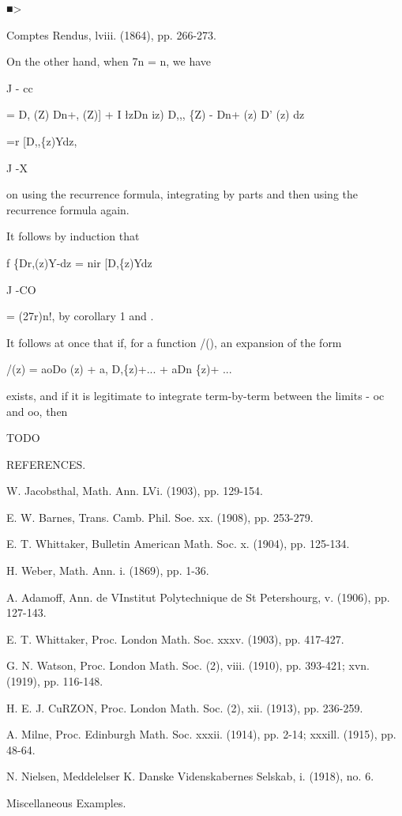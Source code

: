 ■>

Comptes Rendus, lviii. (1864), pp. 266-273.

%
%

On the other hand, when 7n = n, we have

J - cc

= D, (Z) Dn+, (Z)] + I \l zDn iz) D,,, \{Z) - Dn+ (z) D' (z) dz

=r [D,,\{z)Ydz,

J -X

on using the recurrence formula, integrating by parts and then using
the recurrence formula again.

It follows by induction that

f \{Dr,(z)Y-dz = nir [D,\{z)Ydz

J -CO

= (27r)n!, by  corollary 1 and .

It follows at once that if, for a function /(), an expansion of the
form

/(z) = aoDo (z) + a, D,\{z)+... + aDn \{z)+ ...

exists, and if it is legitimate to integrate term-by-term between the
limits - oc and oo, then

TODO

REFERENCES.

W. Jacobsthal, Math. Ann. LVi. (1903), pp. 129-154.

E. W. Barnes, Trans. Camb. Phil. Soe. xx. (1908), pp. 253-279.

E. T. Whittaker, Bulletin American Math. Soc. x. (1904), pp. 125-134.

H. Weber, Math. Ann. i. (1869), pp. 1-36.

A. Adamoff, Ann. de VInstitut Polytechnique de St Petershourg, v.
(1906), pp. 127-143.

E. T. Whittaker, Proc. London Math. Soc. xxxv. (1903), pp. 417-427.

G. N. Watson, Proc. London Math. Soc. (2), viii. (1910), pp. 393-421;
xvn. (1919), pp. 116-148.

H. E. J. CuRZON, Proc. London Math. Soc. (2), xii. (1913), pp.
236-259.

A. Milne, Proc. Edinburgh Math. Soc. xxxii. (1914), pp. 2-14; xxxill.
(1915), pp. 48-64.

N. Nielsen, Meddelelser K. Danske Videnskabernes Selskab, i. (1918),
no. 6.

%
%

Miscellaneous Examples.

